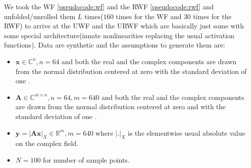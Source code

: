 We took the \ac{WF}\cite{Candes2014} \cref{pseudocode:wf} and the \ac{RWF}\cite{Zhang2016} \cref{pseudocode:rwf}  and unfolded/unrolled them $L$ times($160$ times for the \ac{WF} 
and $30$ times for the \ac{RWF}) to arrive at the \ac{UWF} and the \ac{URWF} which are basically just some \nn\cite{Goodfellow2016}\cite{Bishop2006}\index{\nn} 
with some special architecture(innate nonlinearities replacing the usual activation functions). Data are synthetic and the assumptions to generate them are:
\begin{itemize}
  \item $\boldsymbol{x} \in \mathbb{C}^{n}, n=64$ and both the real and the complex components are drawn from the normal distribution 
  centered at zero with the standard deviation of one \cite{Candes2014}\cite{Zhang2016}.
  \item $\boldsymbol{A} \in \mathbb{C}^{m \times n}, n=64, m=640$ and both the real and the complex components are drawn from the normal distribution 
  centered at zero and with the standard deviation of one \cite{Candes2014}\cite{Zhang2016}.
  \item $\boldsymbol{y}= \left|\boldsymbol{A}\boldsymbol{x}\right|_{X} \in \mathbb{R}^m, m=640$ where $\left|\boldsymbol{.}\right|_X$ is the elementwise usual absolute value on the complex field.
  \item $N=100$ for number of sample points.
\end{itemize}

